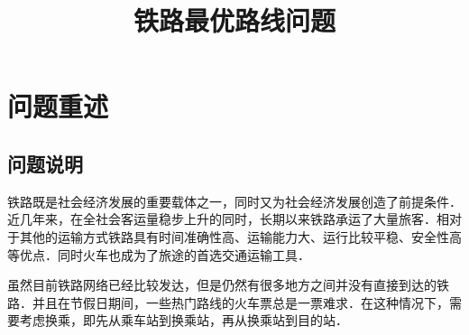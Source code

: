 \documentclass[UTF8]{ctexart}
\begin{document}
\title{铁路最优路线问题}

\maketitle

%
%




\section{问题重述}
\subsection{问题说明}
铁路既是社会经济发展的重要载体之一，同时又为社会经济发展创造了前提条件．近几年来，在全社会客运量稳步上升的同时，长期以来铁路承运了大量旅客．相对于其他的运输方式铁路具有时间准确性高、运输能力大、运行比较平稳、安全性高等优点．同时火车也成为了旅途的首选交通运输工具．

虽然目前铁路网络已经比较发达，但是仍然有很多地方之间并没有直接到达的铁路．并且在节假日期间，一些热门路线的火车票总是一票难求．在这种情况下，需要考虑换乘，即先从乘车站到换乘站，再从换乘站到目的站．
\end{document}
